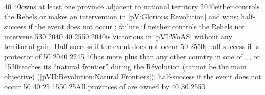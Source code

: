 %
%
%
{}{40}{}%
%
%
{}{40}{\paysmajeurFrance owns at least one province adjacent to
  \paysmajeurHollande national territory}%
%
%
{20}{40}{\paysmajeurFrance either controls the Rebels or makes an intervention
  in \ref{pV:Glorious Revolution} and wins; half-success if the event does not
  occur ; failure if \paysmajeurFrance neither controls the Rebels nor
  intervene}%
%
%
{5}{30}{}%
%
%
{20}{40}{}%
%
%
%
{}{40}{}%
%
%
{25}{50}{\EU@objWoSS}%
%
%
{20}{40}{\paysmajeurFrance is victorious in \ref{pVI:WoAS} without any
  territorial gain. Half-success if the event does not occur}%
%
%
{}{50}{}%
%
%
{25}{50}{\EU@objPOLVictory; half-success if \paysmajeurSuede is protector of
  \paysPologne}%
%
%
%
{}{50}{}%
%
%
{20}{40}{\EU@objEachCC}%
%
%
{22}{45}{\EU@objIndependanceWars}%
%
%
{}{40}{\paysmajeurFrance has more \TP plus \COL than any other country in
  one of , , or
  }%
%
%
%
{15}{30}{\paysmajeurFrance reaches its ``natural frontier'' during the
  Révolution (cannot be the main objective) (\ref{pVII:Revolution:Natural
    Frontiers}); half-success if the event does not occur}%
%
 
%
%
{}{50}{\EU@objNoFrenchVassal}%
%
%
{}{40}{\EU@objNoFrenchItaly}%
%
%
{}{25}{\EU@objSDCF}%
%
%
{15}{50}{\EU@objPresidiosHIS}%
%
%
{}{25}{All provinces of \paysprovincesne are owned by \paysmajeurEspagne}%
%
%
%
{}{40}{\EU@objNoFrenchVassal}%
%
%
{}{30}{\EU@objNoFrenchItaly}%
%
%
{25}{50}{}%
